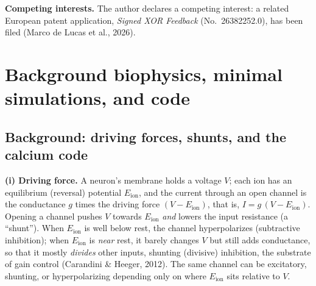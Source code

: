 \documentclass[11pt,a4paper]{article}
\begin{document}
\vspace{0.2em}
\noindent\textbf{Competing interests.} The author declares a competing interest: a related European patent application, \emph{Signed XOR Feedback} (No.~26382252.0), has been filed (Marco de Lucas et al., 2026).

\FloatBarrier
\appendix
{}
\titlespacing{\section}{0pt}{1.2em}{0.4em}


\section{Background biophysics, minimal simulations, and code}\label{app:sim}
\subsection{Background: driving forces, shunts, and the calcium code}\label{app:bg}

\textbf{(i) Driving force.} A neuron's membrane holds a voltage $V$; each ion has an equilibrium (reversal) potential $E_{\mathrm{ion}}$, and the current through an open channel is the conductance $g$ times the driving force $(V-E_{\mathrm{ion}})$, that is, $I = g\,(V - E_{\mathrm{ion}})$. 
Opening a channel pushes $V$ towards $E_{\mathrm{ion}}$ \emph{and} lowers the input resistance (a ``shunt''). When $E_{\mathrm{ion}}$ is well below rest, the channel hyperpolarizes (subtractive inhibition); when $E_{\mathrm{ion}}$ is \emph{near} rest, it barely changes $V$ but still adds conductance, so that it mostly \emph{divides} other inputs, shunting (divisive) inhibition, the substrate of gain control (Carandini \& Heeger, 2012). The same channel can be excitatory, shunting, or hyperpolarizing depending only on where $E_{\mathrm{ion}}$ sits relative to $V$.
\end{document}
